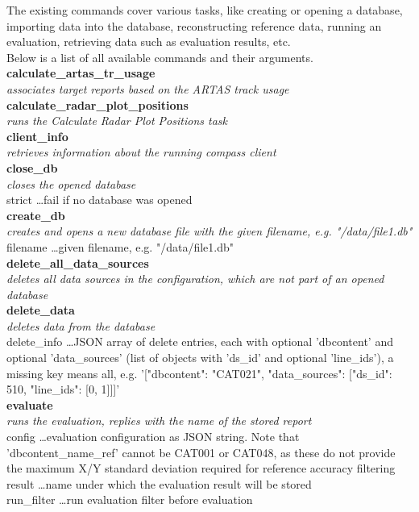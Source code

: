 The existing commands cover various tasks, like creating or opening a database,
importing data into the database, reconstructing reference data, running an evaluation,
retrieving data such as evaluation results, etc. \\

Below is a list of all available commands and their arguments. \\

\textbf{calculate\_artas\_tr\_usage} \\
\textit{associates target reports based on the ARTAS track usage} \\

\textbf{calculate\_radar\_plot\_positions} \\
\textit{runs the Calculate Radar Plot Positions task} \\

\textbf{client\_info} \\
\textit{retrieves information about the running compass client} \\

\textbf{close\_db} \\
\textit{closes the opened database} \\
strict \dots fail if no database was opened \\

\textbf{create\_db} \\
\textit{creates and opens a new database file with the given filename, e.g. "/data/file1.db"} \\
filename \dots given filename, e.g. "/data/file1.db" \\

\textbf{delete\_all\_data\_sources} \\
\textit{deletes all data sources in the configuration, which are not part of an opened database} \\

\textbf{delete\_data} \\
\textit{deletes data from the database} \\
delete\_info \dots JSON array of delete entries, each with optional 'dbcontent' and optional 'data\_sources' (list of objects with 'ds\_id' and optional 'line\_ids'), a missing key means all, e.g. '[{"dbcontent": "CAT021", "data\_sources": [{"ds\_id": 510, "line\_ids": [0, 1]}]}]' \\

\textbf{evaluate} \\
\textit{runs the evaluation, replies with the name of the stored report} \\
config \dots evaluation configuration as JSON string. Note that 'dbcontent\_name\_ref' cannot be CAT001 or CAT048, as these do not provide the maximum X/Y standard deviation required for reference accuracy filtering \\
result \dots name under which the evaluation result will be stored \\
run\_filter \dots run evaluation filter before evaluation \\

